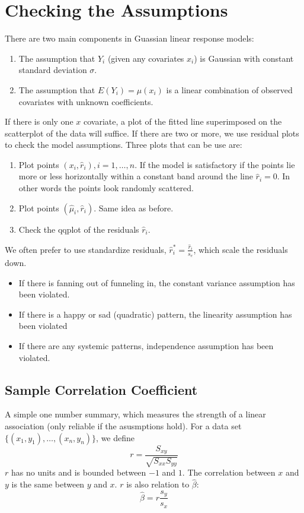 \documentclass[12pt]{article}
\begin{document}
\section{Checking the Assumptions}
There are two main components in Guassian linear response models:
\begin{enumerate}
    \item The assumption that $Y_i$ (given any covariates $x_i$) is Gaussian with constant standard deviation $\sigma$.
    \item The assumption that $E(Y_i)=\mu(x_i)$ is a linear combination of observed covariates with unknown coefficients.
\end{enumerate}
If there is only one $x$ covariate, a plot of the fitted line superimposed on the scatterplot of the data will suffice. If there are two or more, we use residual plots to check the model assumptions. Three plots that can be use are:
\begin{enumerate}
    \item Plot points $(x_i,\hat r_i), i=1,\dots,n$. If the model is satisfactory if the points lie more or less horizontally within a constant band around the line $\hat r_i=0$. In other words the points look randomly scattered.
    \item Plot points $(\hat\mu_i,\hat r_i)$. Same idea as before.
    \item Check the qqplot of the residuals $\hat r_i$.
\end{enumerate}
We often prefer to use standardize residuals, $\hat r^*_i=\frac{\hat r_i}{s_e}$, which scale the residuals down.
\begin{itemize}
    \item If there is fanning out of funneling in, the constant variance assumption has been violated.
    \item If there is a happy or sad (quadratic) pattern, the linearity assumption has been violated
    \item If there are any systemic patterns, independence assumption has been violated.
\end{itemize}

\subsection{Sample Correlation Coefficient}
A simple one number summary, which measures the strength of a linear association (only reliable if the asusmptions hold). For a data set $\{(x_1,y_1),\dots,(x_n,y_n)\}$, we define \[r=\frac{S_{xy}}{\sqrt{S_{xx}S_{yy}}}\]$r$ has no units and is bounded between $-1$ and $1$. The correlation between $x$ and $y$ is the same between $y$ and $x$. $r$ is also relation to $\hat\beta$:\[\hat\beta=r\frac{s_y}{s_x}\]
\end{document}
